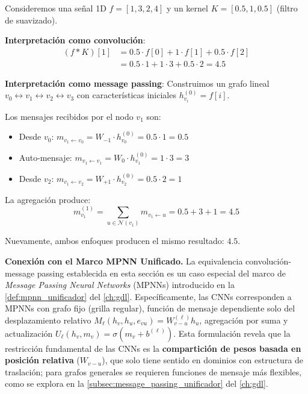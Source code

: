 \begin{example}[Demostración Paso a Paso: Convolución = Message Passing]\label{ex:paso_a_paso_conv_mp}
Consideremos una señal 1D $f = [1, 3, 2, 4]$ y un kernel $K = [0.5, 1, 0.5]$ (filtro de suavizado).

\textbf{Interpretación como convolución}:
\begin{align}
(f * K)[1] &= 0.5 \cdot f[0] + 1 \cdot f[1] + 0.5 \cdot f[2] \\
           &= 0.5 \cdot 1 + 1 \cdot 3 + 0.5 \cdot 2 = 4.5
\end{align}

\textbf{Interpretación como message passing}:
Construimos un grafo lineal $v_0 \leftrightarrow v_1 \leftrightarrow v_2 \leftrightarrow v_3$ con características iniciales $h_{v_i}^{(0)} = f[i]$.

Los mensajes recibidos por el nodo $v_1$ son:
\begin{itemize}
    \item Desde $v_0$: $m_{v_1 \leftarrow v_0} = W_{-1} \cdot h_{v_0}^{(0)} = 0.5 \cdot 1 = 0.5$
    \item Auto-mensaje: $m_{v_1 \leftarrow v_1} = W_0 \cdot h_{v_1}^{(0)} = 1 \cdot 3 = 3$
    \item Desde $v_2$: $m_{v_1 \leftarrow v_2} = W_{+1} \cdot h_{v_2}^{(0)} = 0.5 \cdot 2 = 1$
\end{itemize}

La agregación produce:
\[
m_{v_1}^{(1)} = \sum_{u \in \mathcal{N}(v_1)} m_{v_1 \leftarrow u} = 0.5 + 3 + 1 = 4.5
\]

Nuevamente, ambos enfoques producen el mismo resultado: $4.5$.
\end{example}

\textbf{Conexión con el Marco MPNN Unificado.} La equivalencia convolución-message passing establecida en esta sección es un caso especial del marco de \textit{Message Passing Neural Networks} (\glspl{MPNN}) introducido en la \autoref{def:mpnn_unificador} del \autoref{ch:gdl}. Específicamente, las CNNs corresponden a MPNNs con grafo fijo (grilla regular), función de mensaje dependiente solo del desplazamiento relativo $M_\ell(h_v, h_u, e_{vu}) = W_{v-u}^{(\ell)} h_u$, agregación por suma y actualización $U_\ell(h_v, m_v) = \sigma(m_v + b^{(\ell)})$. Esta formulación revela que la restricción fundamental de las CNNs es la \textbf{compartición de pesos basada en posición relativa} ($W_{v-u}$), que solo tiene sentido en dominios con estructura de traslación; para grafos generales se requieren funciones de mensaje más flexibles, como se explora en la \autoref{subsec:message_passing_unificador} del \autoref{ch:gdl}.

